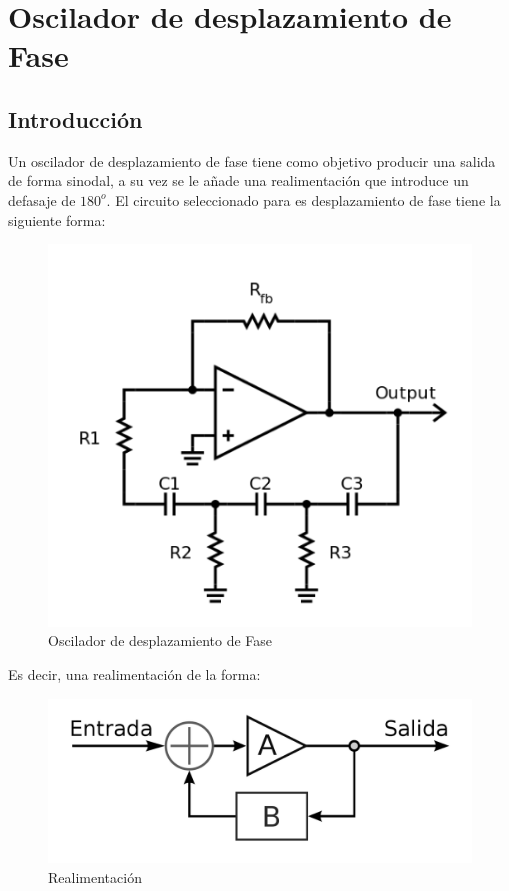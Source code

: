 \section{Oscilador de desplazamiento de Fase}

\subsection{Introducción}

Un oscilador de desplazamiento de fase tiene como objetivo producir una salida de forma sinodal, a su vez se le añade una realimentación que introduce un defasaje de $180^o$. El circuito seleccionado para es desplazamiento de fase tiene la siguiente forma:

\begin{figure}[H]
    \centering
    \includegraphics[scale = 0.6]{../2-OscFase/Informe/cir.png}
    \caption{Oscilador de desplazamiento de Fase}
    \label{ej2cir}
\end{figure}

Es decir, una realimentación de la forma:

\begin{figure}[H]
    \centering
    \includegraphics[scale = 0.2]{../2-OscFase/Informe/realim.png}
    \caption{Realimentación}
    \label{ej2realim}
\end{figure}

